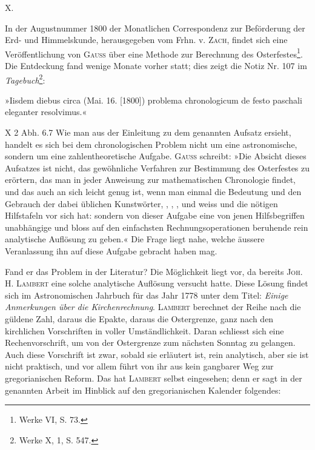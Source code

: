 \clearpage\begingroup{}
\renewcommand{\thefootnote}{\arabic{footnote})}\setcounter{footnote}{1}
\begin{center}\large X.\par{}\end{center}
\noindent\hspace*{\parindent}In der Augustnummer 1800 der Monatlichen Correspondenz zur Beförderung der Erd- und Himmelskunde, herausgegeben vom Frhn. v. \textsc{Zach},
findet sich eine Veröffentlichung von \textsc{Gauss} über eine Methode zur Berechnung des Osterfestes\footnote{Werke VI, S. 73.}. Die Entdeckung fand wenige Monate vorher statt;
dies zeigt die Notiz Nr. 107 im \textit{Tagebuch}\footnote{Werke X, 1, S. 547.}:

»Iisdem diebus circa (Mai. 16. [1800]) problema chronologicum de festo
paschali eleganter resolvimus.«
\par\noindent X 2 Abh. 6.\hfill 7
\clearpage{}
\setcounter{footnote}{0}
\noindent\hspace*{\parindent}Wie man aus der Einleitung zu dem genannten Aufsatz ersieht, handelt
es sich bei dem chronologischen Problem nicht um eine astronomische, sondern um eine zahlentheoretische Aufgabe. \textsc{Gauss} schreibt: »Die Absicht dieses
Aufsatzes ist nicht, das gewöhnliche Verfahren zur Bestimmung des Osterfestes zu erörtern, das man in jeder Anweisung zur mathematischen Chronologie findet, und das auch an sich leicht genug ist, wenn man einmal die
Bedeutung und den Gebrauch der dabei üblichen Kunstwörter, ,
, ,  und  weiss
und die nötigen Hilfstafeln vor sich hat: sondern von dieser Aufgabe eine
von jenen Hilfsbegriffen unabhängige und bloss auf den einfachsten Rechnungsoperationen beruhende rein analytische Auflösung zu geben.« Die Frage
liegt nahe, welche äussere Veranlassung ihn auf diese Aufgabe gebracht
haben mag.

Fand er das Problem in der Literatur? Die Möglichkeit liegt vor, da bereits
\textsc{Joh. H. Lambert} eine solche analytische Auflösung versucht hatte. Diese Lösung
findet sich im Astronomischen Jahrbuch für das Jahr 1778 unter dem Titel:
\textit{Einige Anmerkungen über die Kirchenrechnung}. \textsc{Lambert} berechnet der Reihe nach
die güldene Zahl, daraus die Epakte, daraus die Ostergrenze, ganz nach den
kirchlichen Vorschriften in voller Umständlichkeit. Daran schliesst sich eine
Rechenvorschrift, um von der Ostergrenze zum nächsten Sonntag zu gelangen.
Auch diese Vorschrift ist zwar, sobald sie erläutert ist, rein analytisch, aber
sie ist nicht praktisch, und vor allem führt von ihr aus kein gangbarer Weg
zur gregorianischen Reform. Das hat \textsc{Lambert} selbst eingesehen; denn er
sagt in der genannten Arbeit im Hinblick auf den gregorianischen Kalender
folgendes:

